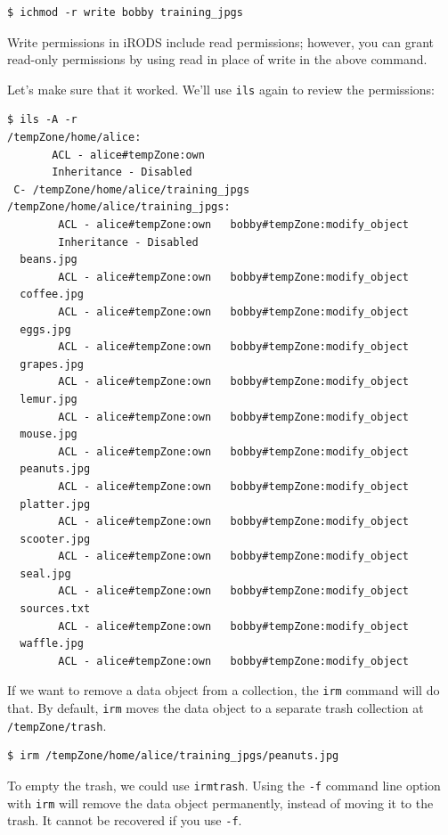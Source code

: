 \documentclass[10pt,oneside]{memoir}
\begin{document}
\begin{lstlisting}
$ ichmod -r write bobby training_jpgs
\end{lstlisting}

Write permissions in iRODS include read permissions; however, you can grant read-only permissions by using read in place of write in the above command.

Let's make sure that it worked. We'll use \texttt{ils} again to review the permissions:

\begin{lstlisting}[basicstyle=\tiny\ttfamily]
$ ils -A -r
/tempZone/home/alice:
       ACL - alice#tempZone:own
       Inheritance - Disabled
 C- /tempZone/home/alice/training_jpgs
/tempZone/home/alice/training_jpgs:
        ACL - alice#tempZone:own   bobby#tempZone:modify_object
        Inheritance - Disabled
  beans.jpg
        ACL - alice#tempZone:own   bobby#tempZone:modify_object
  coffee.jpg
        ACL - alice#tempZone:own   bobby#tempZone:modify_object
  eggs.jpg
        ACL - alice#tempZone:own   bobby#tempZone:modify_object
  grapes.jpg
        ACL - alice#tempZone:own   bobby#tempZone:modify_object
  lemur.jpg
        ACL - alice#tempZone:own   bobby#tempZone:modify_object
  mouse.jpg
        ACL - alice#tempZone:own   bobby#tempZone:modify_object
  peanuts.jpg
        ACL - alice#tempZone:own   bobby#tempZone:modify_object
  platter.jpg
        ACL - alice#tempZone:own   bobby#tempZone:modify_object
  scooter.jpg
        ACL - alice#tempZone:own   bobby#tempZone:modify_object
  seal.jpg
        ACL - alice#tempZone:own   bobby#tempZone:modify_object
  sources.txt
        ACL - alice#tempZone:own   bobby#tempZone:modify_object
  waffle.jpg
        ACL - alice#tempZone:own   bobby#tempZone:modify_object
\end{lstlisting}

If we want to remove a data object from a collection, the \texttt{irm} command will do that. By default, \texttt{irm} moves the data object to a separate trash collection at \texttt{/tempZone/trash}.

\begin{lstlisting}
$ irm /tempZone/home/alice/training_jpgs/peanuts.jpg
\end{lstlisting}

To empty the trash, we could use \texttt{irmtrash}. Using the \texttt{-f} command line option with \texttt{irm} will remove the data object permanently, instead of moving it to the trash. It cannot be recovered if you use \texttt{-f}.
\end{document}
